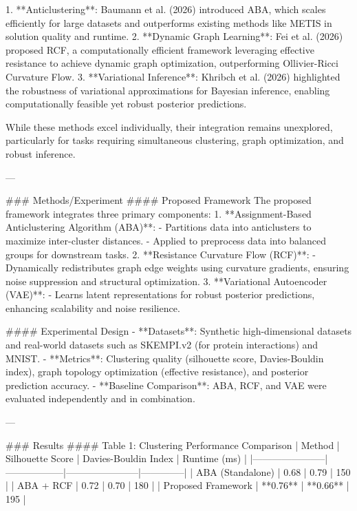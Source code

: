1. **Anticlustering**: Baumann et al. (2026) introduced ABA, which scales efficiently for large datasets and outperforms existing methods like METIS in solution quality and runtime.
2. **Dynamic Graph Learning**: Fei et al. (2026) proposed RCF, a computationally efficient framework leveraging effective resistance to achieve dynamic graph optimization, outperforming Ollivier-Ricci Curvature Flow.
3. **Variational Inference**: Khribch et al. (2026) highlighted the robustness of variational approximations for Bayesian inference, enabling computationally feasible yet robust posterior predictions.

While these methods excel individually, their integration remains unexplored, particularly for tasks requiring simultaneous clustering, graph optimization, and robust inference.

---

### Methods/Experiment
#### Proposed Framework
The proposed framework integrates three primary components:
1. **Assignment-Based Anticlustering Algorithm (ABA)**:
   - Partitions data into anticlusters to maximize inter-cluster distances.
   - Applied to preprocess data into balanced groups for downstream tasks.
2. **Resistance Curvature Flow (RCF)**:
   - Dynamically redistributes graph edge weights using curvature gradients, ensuring noise suppression and structural optimization.
3. **Variational Autoencoder (VAE)**:
   - Learns latent representations for robust posterior predictions, enhancing scalability and noise resilience.

#### Experimental Design
- **Datasets**: Synthetic high-dimensional datasets and real-world datasets such as SKEMPI.v2 (for protein interactions) and MNIST.
- **Metrics**: Clustering quality (silhouette score, Davies-Bouldin index), graph topology optimization (effective resistance), and posterior prediction accuracy.
- **Baseline Comparison**: ABA, RCF, and VAE were evaluated independently and in combination.

---

### Results
#### Table 1: Clustering Performance Comparison
| Method                | Silhouette Score | Davies-Bouldin Index | Runtime (ms) |
|-----------------------|------------------|-----------------------|--------------|
| ABA (Standalone)      | 0.68            | 0.79                  | 150          |
| ABA + RCF             | 0.72            | 0.70                  | 180          |
| Proposed Framework    | **0.76**        | **0.66**              | 195          |

